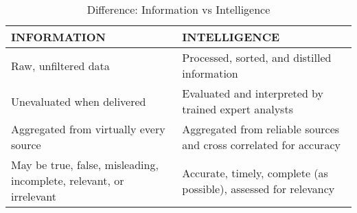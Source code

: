 

\begin{table}[htbp!]
   \setlength{\arrayrulewidth}{0.1mm}
    \setlength{\tabcolsep}{3pt}
    \renewcommand{\arraystretch}{1.0}

    \centering{}
 
    \caption{Difference: Information vs Intelligence}
    \label{table:info-intel}
    
    \begin{tabularx}{0.9\linewidth}{| X|X|} 
    
     \arrayrulecolor[HTML]{06000A}
        \hline
       
         \rowcolor[HTML]{BFCEED} INFORMATION & INTELLIGENCE \\
        \hline
      Raw, unfiltered data	&	Processed, sorted, and distilled information	\\
      \hline
Unevaluated when delivered	&	Evaluated and interpreted by trained expert analysts	\\
\hline
Aggregated from virtually every source	&	Aggregated from reliable sources and cross correlated for accuracy	\\
\hline
May be true, false, misleading, incomplete, relevant, or irrelevant	&	Accurate, timely, complete (as possible), assessed for relevancy	\\
       
        \hline
    \end{tabularx}

\end{table}
